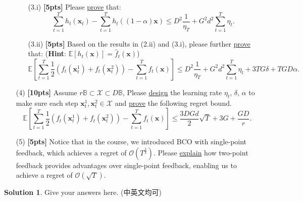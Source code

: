 \documentclass[a4paper]{article}
\numberwithin{equation}{section}
\theoremstyle{definition}
\newtheorem*{solution}{Solution}
\theoremstyle{definition}
\def \E {\mathbb{E}}
\def \O {\mathcal{O}}
\begin{document}
\begin{enumerate}
  \begin{enumerate}
    \item[(3.i)] \textbf{[5pts]} Please \underline{prove} that:
    \begin{equation*}
      \sum_{t=1}^T h_t\left(\mathbf{x}_t\right)-\sum_{t=1}^T h_t((1-\alpha)\mathbf{x}) \leq D^2\frac{1}{\eta_T}+G^2d^2\sum_{t=1}^T \eta_t.
    \end{equation*}
    \item[(3.ii)] \textbf{[5pts]} Based on the results in (2.ii) and (3.i), please further \underline{prove} that: (\textbf{Hint}: $\mathbb{E}[h_t(\mathbf{x})] = \widehat{f}_t(\mathbf{x})$)
    \begin{equation*}
      \E\left[\sum_{t=1}^T \frac{1}{2}\left(f_t\left(\mathbf{x}_t^1\right)+f_t\left(\mathbf{x}_t^2\right)\right)-\sum_{t=1}^T f_t(\mathbf{x})\right] \leq D^2\frac{1}{\eta_T}+G^2d^2\sum_{t=1}^T \eta_t+3 T G \delta+T G D \alpha.
    \end{equation*}
  \end{enumerate}


  \item[(4)] \textbf{[10pts]} Assume $r\mathbb{B}\subset \mathcal{X}\subset D\mathbb{B}$, Please \underline{design} the learning rate $\eta_t$, $\delta$, $\alpha$ to make sure each step $\mathbf{x}_t^1, \mathbf{x}_t^2 \in\mathcal{X}$ and \underline{prove} the following regret bound.
  \begin{equation*}
    \E\left[\sum_{t=1}^T \frac{1}{2}\left(f_t\left(\mathbf{x}_t^1\right)+f_t\left(\mathbf{x}_t^2\right)\right)-\sum_{t=1}^T f_t(\mathbf{x})\right] \leq \frac{3DGd}{2}\sqrt{T}+3G + \frac{GD}{r}.
  \end{equation*}
  \item[(5)] \textbf{[5pts]} Notice that in the course, we introduced BCO with single-point feedback, which achieves a regret of $\mathcal{O}(T^{\frac{3}{4}})$. Please \underline{explain} how two-point feedback provides advantages over single-point feedback, enabling us to achieve a regret of $\O(\sqrt{T})$.
\end{enumerate}

\begin{solution}
Give your answers here. (中英文均可)
~\\
~\\
~\\
\end{solution}



\newpage
\end{document}
